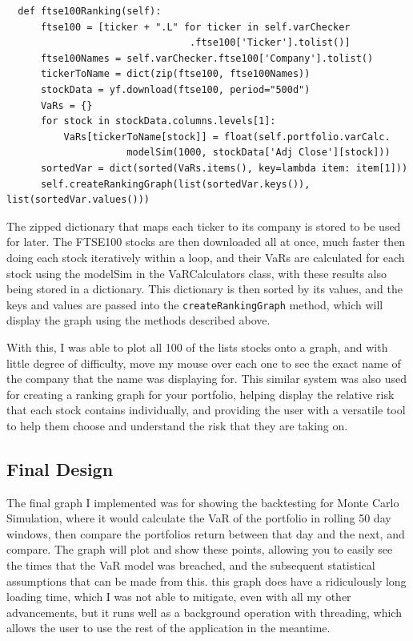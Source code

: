 \documentclass{article}
\begin{document}
\begin{verbatim}
  def ftse100Ranking(self):
      ftse100 = [ticker + ".L" for ticker in self.varChecker
                                .ftse100['Ticker'].tolist()]
      ftse100Names = self.varChecker.ftse100['Company'].tolist()
      tickerToName = dict(zip(ftse100, ftse100Names))
      stockData = yf.download(ftse100, period="500d")
      VaRs = {}
      for stock in stockData.columns.levels[1]:
          VaRs[tickerToName[stock]] = float(self.portfolio.varCalc.
                     modelSim(1000, stockData['Adj Close'][stock])) 
      sortedVar = dict(sorted(VaRs.items(), key=lambda item: item[1]))
      self.createRankingGraph(list(sortedVar.keys()), list(sortedVar.values()))
\end{verbatim}

\vspace{0.3cm}
The zipped dictionary that maps each ticker to its company is stored to be used for later. The FTSE100 stocks are then downloaded all at once, much faster then doing each stock iteratively within a loop, and their VaRs are calculated for each stock using the modelSim in the VaRCalculators class, with these results also being stored in a dictionary. This dictionary is then sorted by its values, and the keys and values are passed into the \texttt{createRankingGraph} method, which will display the graph using the methods described above.\\\vspace{0.3cm}

With this, I was able to plot all 100 of the lists stocks onto a graph, and with little degree of difficulty, move my mouse over each one to see the exact name of the company that the name was displaying for. This similar system was also used for creating a ranking graph for your portfolio, helping display the relative risk that each stock contains individually, and providing the user with a versatile tool to help them choose and understand the risk that they are taking on.\\\vspace{0.3cm}

\newpage
\subsection{Final Design}
The final graph I implemented was for showing the backtesting for Monte Carlo Simulation, where it would calculate the VaR of the portfolio in rolling 50 day windows, then compare the portfolios return between that day and the next, and compare. The graph will plot and show these points, allowing you to easily see the times that the VaR model was breached, and the subsequent statistical assumptions that can be made from this. this graph does have a ridiculously long loading time, which I was not able to mitigate, even with all my other advancements, but it runs well as a background operation with threading, which allows the user to use the rest of the application in the meantime. \\\vspace{0.3cm}
\end{document}
